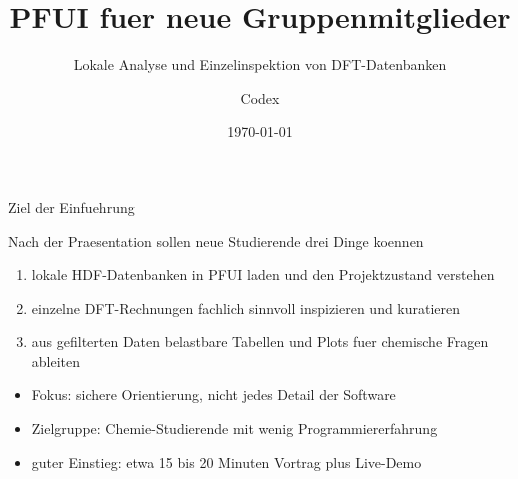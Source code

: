 \documentclass[aspectratio=169,10pt]{beamer}
\title{PFUI fuer neue Gruppenmitglieder}
\subtitle{Lokale Analyse und Einzelinspektion von DFT-Datenbanken}
\author{Codex}
\institute{Onboarding fuer die Forschungsgruppe}
\date{\today}
\begin{document}
\begin{frame}
  \titlepage
\end{frame}

\begin{frame}{Ziel der Einfuehrung}
  \begin{block}{Nach der Praesentation sollen neue Studierende drei Dinge koennen}
    \begin{enumerate}
      \item lokale HDF-Datenbanken in PFUI laden und den Projektzustand verstehen
      \item einzelne DFT-Rechnungen fachlich sinnvoll inspizieren und kuratieren
      \item aus gefilterten Daten belastbare Tabellen und Plots fuer chemische Fragen ableiten
    \end{enumerate}
  \end{block}

  \vspace{0.4cm}
  \begin{itemize}
    \item Fokus: sichere Orientierung, nicht jedes Detail der Software
    \item Zielgruppe: Chemie-Studierende mit wenig Programmiererfahrung
    \item guter Einstieg: etwa 15 bis 20 Minuten Vortrag plus Live-Demo
  \end{itemize}
\end{frame}
\end{document}
